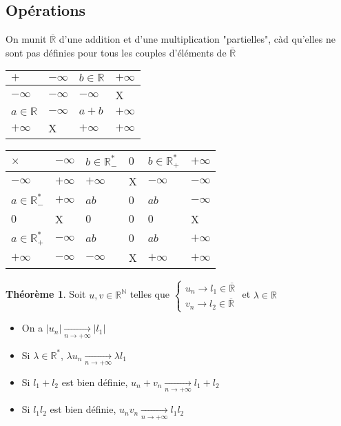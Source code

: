 \documentclass[10pt,a4paper]{article}
\theoremstyle{definition}
\newtheorem{theorem}[proposition]{Théorème}
\begin{document}
\subsection{Opérations}
On munit $\overline{\mathbb{R}}$ d'une addition et d'une multiplication "partielles", càd qu'elles ne sont pas définies pour tous les couples d'éléments de $\overline{\mathbb{R}}$
\begin{center}
\begin{tabular}{ M{5em} | M{5em} | M{5em} | M{5em} }
$+$ & $-\infty$ & $b \in \mathbb{R}$ & $+\infty$ \\
\hline
$-\infty$ & $-\infty$ & $-\infty$ & X\\
\hline
$a \in \mathbb{R}$ & $-\infty$ & $a + b$ & $+\infty$ \\
\hline
$+\infty$ & X & $+\infty$ & $+\infty$
\end{tabular}
\end{center}
\begin{center}
\begin{tabular}{ M{5em} | M{5em} | M{5em} | M{5em} | M{5em} | M{5em}}
$\times$ & $-\infty$ & $b \in \mathbb{R}_-^*$ & $0$ & $b \in \mathbb{R}_+^*$ & $+\infty$ \\
\hline
$-\infty$ & $+\infty$ & $+\infty$ & X & $-\infty$ & $-\infty$ \\
\hline
$a \in \mathbb{R}_-^*$ & $+\infty$ & $a b$ & $0$ & $a b$ & $-\infty$ \\
\hline
$0$ & X & $0$ & $0$ & $0$ & X \\
\hline
$a \in \mathbb{R}_+^*$ & $-\infty$ & $a b$ & $0$ & $a b$ & $+\infty$ \\
\hline
$+\infty$ & $-\infty$ & $-\infty$ & X & $+\infty$ & $+\infty$
\end{tabular}
\end{center}
\begin{theorem}
Soit $u, v \in \mathbb{R}^\mathbb{N}$ telles que $\begin{cases} u_n \to l_1 \in \overline{\mathbb{R}} \\ v_n \to l_2 \in \overline{\mathbb{R}} \end{cases}$ et $\lambda \in \mathbb{R}$
\begin{itemize}
\item On a $|u_n| \xrightarrow[n \to +\infty]{} |l_1|$
\item Si $\lambda \in \mathbb{R}^*$, $\lambda u_n \xrightarrow[n \to +\infty]{} \lambda l_1$
\item Si $l_1 + l_2$ est bien définie, $u_n + v_n \xrightarrow[n \to +\infty]{} l_1 + l_2$
\item Si $l_1 l_2$ est bien définie, $u_n v_n \xrightarrow[n \to +\infty]{} l_1 l_2$
\end{itemize}
\end{theorem}
\end{document}
